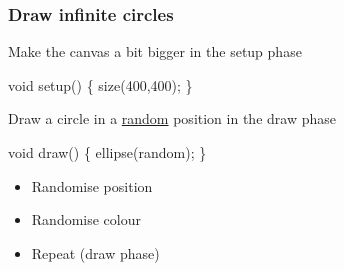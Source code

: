 \documentclass[ignorenonframetext,]{beamer}
\newenvironment{Shaded}{}{}
\newcommand{\DataTypeTok}[1]{\textcolor[rgb]{0.56,0.13,0.00}{{#1}}}
\newcommand{\DecValTok}[1]{\textcolor[rgb]{0.25,0.63,0.44}{{#1}}}
\newcommand{\FunctionTok}[1]{\textcolor[rgb]{0.02,0.16,0.49}{{#1}}}
\newcommand{\NormalTok}[1]{{#1}}
\begin{document}
\begin{frame}[fragile]\frametitle{Draw infinite circles}

Make the canvas a bit bigger in the setup phase

\begin{Shaded}
\begin{Highlighting}[]
\DataTypeTok{void} \FunctionTok{setup}\NormalTok{() \{}
  \FunctionTok{size}\NormalTok{(}\DecValTok{400}\NormalTok{,}\DecValTok{400}\NormalTok{);}
\NormalTok{\}}
\end{Highlighting}
\end{Shaded}

Draw a circle in a
\href{http://processing.org/reference/random\_.html}{random} position in
the draw phase

\begin{Shaded}
\begin{Highlighting}[]
\DataTypeTok{void} \FunctionTok{draw}\NormalTok{() \{}
  \FunctionTok{ellipse}\NormalTok{(random);}
\NormalTok{\}}
\end{Highlighting}
\end{Shaded}

\begin{itemize}
\item
  Randomise position
\item
  Randomise colour
\item
  Repeat (draw phase)
\end{itemize}

\end{frame}
\end{document}
